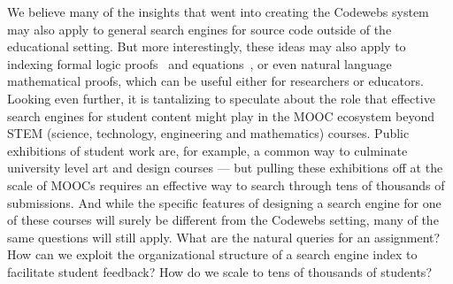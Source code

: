 We believe  many of the insights that went into creating the Codewebs system
may also apply to general search engines for source code outside of the educational setting. 
But more interestingly, these ideas may also apply to indexing formal logic proofs~\cite{fast13} and equations~\cite{kohlhase06}, or even 
natural language mathematical proofs, which can be useful either for researchers or educators.
Looking even further, it is tantalizing to speculate about the role that effective search engines for student content
 might play in the MOOC ecosystem beyond STEM (science, technology, engineering and mathematics) courses. 
Public exhibitions of student work are, for example, a common way to culminate university level art and design courses --- but 
pulling these exhibitions off at the scale of MOOCs requires an effective way to search through tens of thousands of submissions.
And while the specific features of designing a search engine for one of these courses will surely be different from the Codewebs
setting,  many of the same questions will still apply.  
What are the natural queries for an assignment?
How can we exploit the organizational structure of a search engine index to facilitate student feedback?
How do we scale to tens of thousands of students?
